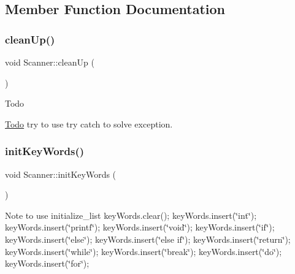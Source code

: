 \subsection{Member Function Documentation}
\hypertarget{class_scanner_a377ef4e058992b4083bd835f30e113aa}{}\label{class_scanner_a377ef4e058992b4083bd835f30e113aa} 
\subsubsection{\texorpdfstring{clean\+Up()}{cleanUp()}}
{\footnotesize\ttfamily void Scanner\+::clean\+Up (\begin{DoxyParamCaption}{ }\end{DoxyParamCaption})}

\begin{DoxyRefDesc}{Todo}
\item[\hyperlink{todo__todo000007}{Todo}]try to use try catch to solve exception. \end{DoxyRefDesc}
\hypertarget{class_scanner_a299d27000feef9ce880a69486d6e67d2}{}\label{class_scanner_a299d27000feef9ce880a69486d6e67d2} 
\subsubsection{\texorpdfstring{init\+Key\+Words()}{initKeyWords()}}
{\footnotesize\ttfamily void Scanner\+::init\+Key\+Words (\begin{DoxyParamCaption}{ }\end{DoxyParamCaption})}

\begin{DoxyNote}{Note}
to use initialize\+\_\+list key\+Words.\+clear(); key\+Words.\+insert(\char`\"{}int\char`\"{}); key\+Words.\+insert(\char`\"{}printf\char`\"{}); key\+Words.\+insert(\char`\"{}void\char`\"{}); key\+Words.\+insert(\char`\"{}if\char`\"{}); key\+Words.\+insert(\char`\"{}else\char`\"{}); key\+Words.\+insert(\char`\"{}else if\char`\"{}); key\+Words.\+insert(\char`\"{}return\char`\"{}); key\+Words.\+insert(\char`\"{}while\char`\"{}); key\+Words.\+insert(\char`\"{}break\char`\"{}); key\+Words.\+insert(\char`\"{}do\char`\"{}); key\+Words.\+insert(\char`\"{}for\char`\"{});
\end{DoxyNote}
\hypertarget{class_scanner_aa0d88db9dafa491ffaf1c0ae92357f20}{}\label{class_scanner_aa0d88db9dafa491ffaf1c0ae92357f20} 
